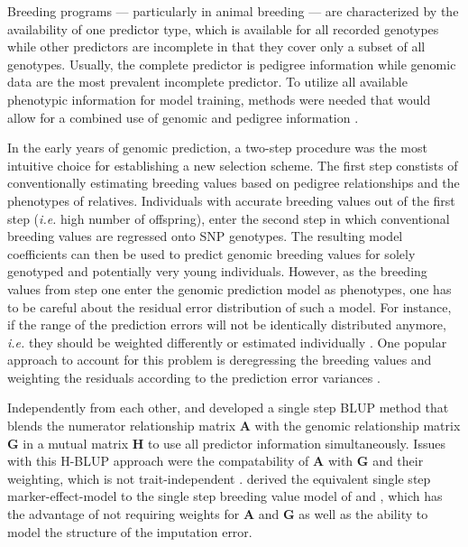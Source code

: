 \documentclass[12pt,titlepage]{article}
\begin{document}
Breeding programs --- particularly in animal breeding --- are characterized by
the availability of one predictor type, which is available for all recorded
genotypes while other predictors are incomplete in that they cover only a 
subset of all genotypes.
Usually, the complete predictor is pedigree information while genomic data are
the most prevalent incomplete predictor.
To utilize all available phenotypic information for model training, methods were 
needed that would allow for a combined use of genomic and pedigree information 
\cite{Hayes2009a,VanRaden2009}.

In the early years of genomic prediction, a two-step procedure was the most
intuitive choice for establishing a new selection scheme.
The first step constists of conventionally estimating breeding values based on
pedigree relationships and the phenotypes of relatives.
Individuals with accurate breeding values out of the first step (\textit{i.e.}
high number of offspring), enter the second step in which conventional breeding
values are regressed onto SNP genotypes.
The resulting model coefficients can then be used to predict genomic breeding 
values for solely genotyped and potentially very young individuals.
However, as the breeding values from step one enter the genomic prediction
model as phenotypes, one has to be careful about the residual error
distribution of such a model.
For instance, if the range of the prediction errors will not be identically
distributed anymore, \textit{i.e.} they should be weighted differently or
estimated individually \cite{Aguilar2010}.
One popular approach to account for this problem is deregressing the breeding
values and weighting the residuals according to the prediction error variances
\cite{Garrick2009}.

Independently from each other,  and
 developed a single step BLUP method that blends the 
numerator relationship matrix $\mathbf{A}$ with the genomic relationship matrix
$\mathbf{G}$ in a mutual matrix $\mathbf{H}$ to use all predictor information
simultaneously.
Issues with this H-BLUP approach were the compatability of $\mathbf{A}$ with
$\mathbf{G}$ \cite{Christensen2012} and their weighting, which is not
trait-independent \cite{Ashraf2016}.
 derived the equivalent single step marker-effect-model to 
the single step breeding value model of  and 
, which has the advantage of not requiring weights for
$\mathbf{A}$ and $\mathbf{G}$ as well as the ability to model the structure of 
the imputation error.
\end{document}
